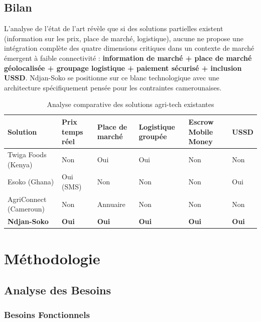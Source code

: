 \documentclass[12pt,a4paper]{report}
\begin{document}
\section{Bilan}

L'analyse de l'état de l'art révèle que si des solutions partielles existent (information sur les prix, place de marché, logistique), aucune ne propose une intégration complète des quatre dimensions critiques dans un contexte de marché émergent à faible connectivité : \textbf{information de marché + place de marché géolocalisée + groupage logistique + paiement sécurisé + inclusion USSD}. Ndjan-Soko se positionne sur ce blanc technologique avec une architecture spécifiquement pensée pour les contraintes camerounaises.

\begin{table}[H]
\centering
\caption{Analyse comparative des solutions agri-tech existantes}
\begin{tabularx}{\textwidth}{L{3.2cm} C{2.1cm} C{2.1cm} C{2.2cm} C{2.3cm} C{1.5cm}}
\toprule
\textbf{Solution} & \textbf{Prix temps réel} & \textbf{Place de marché} & \textbf{Logistique groupée} & \textbf{Escrow Mobile Money} & \textbf{USSD} \\
\midrule
Twiga Foods (Kenya) & Non & Oui & Oui & Non & Non \\
Esoko (Ghana) & Oui (SMS) & Non & Non & Non & Oui \\
AgriConnect (Cameroun) & Non & Annuaire & Non & Non & Non \\
\textbf{Ndjan-Soko} & \textbf{Oui} & \textbf{Oui} & \textbf{Oui} & \textbf{Oui} & \textbf{Oui} \\
\bottomrule
\end{tabularx}
\end{table}

\chapter{Méthodologie}

\section{Analyse des Besoins}

\subsection{Besoins Fonctionnels}
\end{document}
